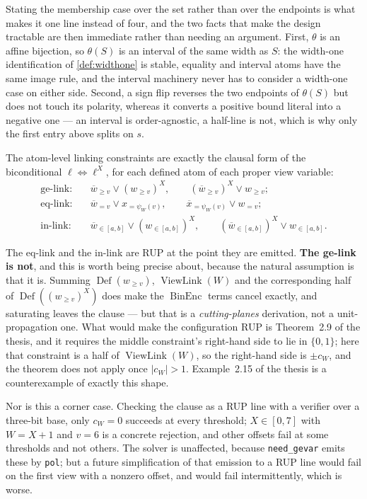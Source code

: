 \documentclass[11pt,a4paper]{article}
\theoremstyle{plain}
\theoremstyle{definition}
\theoremstyle{remark}
\newcommand{\fname}[1]{\ensuremath{\operatorname{#1}}}
\newcommand{\BinEnc}{\fname{BinEnc}}
\newcommand{\Def}{\fname{Def}}
\newcommand{\ViewLink}{\fname{ViewLink}}
\newcommand{\atge}[2]{#1_{\geq #2}}
\newcommand{\ateq}[2]{#1_{= #2}}
\newcommand{\atin}[3]{#1_{\in[#2,#3]}}
\newcommand{\natge}[2]{\overline{#1}_{\geq #2}}
\newcommand{\nateq}[2]{\overline{#1}_{= #2}}
\newcommand{\natin}[3]{\overline{#1}_{\in[#2,#3]}}
\newcommand{\code}[1]{\texttt{#1}}
\begin{document}
Stating the membership case over the set rather than over the endpoints is what
makes it one line instead of four, and the two facts that make the design
tractable are then immediate rather than needing an argument.  First, $\theta$ is
an affine bijection, so $\theta(S)$ is an interval of the same width as $S$: the
width-one identification of \cref{def:widthone} is stable, equality and interval
atoms have the same image rule, and the interval machinery never has to consider
a width-one case on either side.  Second, a sign flip reverses the two endpoints
of $\theta(S)$ but does not touch its polarity, whereas it converts a positive
bound literal into a negative one --- an interval is order-agnostic, a half-line
is not, which is why only the first entry above splits on $s$.

The atom-level linking constraints are exactly the clausal form of the biconditional
$\ell \Leftrightarrow \ell^{X}$, for each defined atom of each proper
view variable:
\begin{align}
  \text{ge-link:}\quad
    &\natge{w}{v}\vee (\atge{w}{v})^{X}, \qquad
     (\natge{w}{v})^{X}\vee \atge{w}{v};
     \label{eq:gelink}\\
  \text{eq-link:}\quad
    &\nateq{w}{v}\vee \ateq{x}{\psi_W(v)}, \qquad
     \nateq{x}{\psi_W(v)}\vee \ateq{w}{v};
     \label{eq:eqlink}\\
  \text{in-link:}\quad
    &\natin{w}{a}{b}\vee (\atin{w}{a}{b})^{X}, \qquad
     (\natin{w}{a}{b})^{X}\vee \atin{w}{a}{b}.
     \label{eq:inlink}
\end{align}

The eq-link and the in-link are RUP at the point they are emitted.  \textbf{The
ge-link is not}, and this is worth being precise about, because the natural
assumption is that it is.  Summing $\Def(\atge{w}{v})$, $\ViewLink(W)$ and the
corresponding half of $\Def((\atge{w}{v})^X)$ does make the $\BinEnc$ terms
cancel exactly, and saturating leaves the clause --- but that is a
\emph{cutting-planes} derivation, not a unit-propagation one.  What would make
the configuration RUP is Theorem~2.9 of the thesis, and it requires the middle
constraint's right-hand side to lie in $\{0,1\}$; here that constraint is a half
of $\ViewLink(W)$, so the right-hand side is $\pm c_W$, and the theorem does not
apply once $|c_W|>1$.  Example~2.15 of the thesis is a counterexample of exactly
this shape.

Nor is this a corner case.  Checking the clause as a RUP line with a verifier
over a three-bit base, only $c_W = 0$ succeeds at every threshold; $X\in[0,7]$
with $W = X+1$ and $v=6$ is a concrete rejection, and other offsets fail at some
thresholds and not others.  The solver is unaffected, because
\code{need\_gevar} emits these by \code{pol}; but a future simplification of that
emission to a RUP line would fail on the first view with a nonzero offset, and
would fail intermittently, which is worse.
\end{document}
